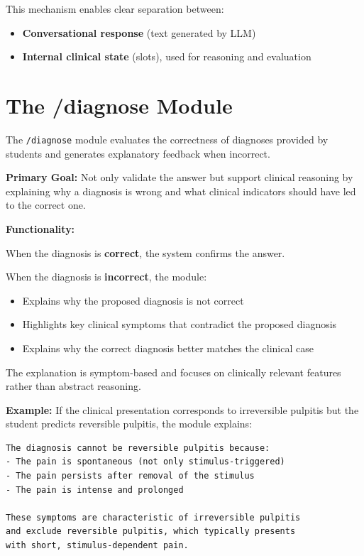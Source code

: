 \documentclass[runningheads,a4paper,11pt]{report}
\begin{document}
This mechanism enables clear separation between:
\begin{itemize}
\item \textbf{Conversational response} (text generated by LLM)
\item \textbf{Internal clinical state} (slots), used for reasoning and evaluation
\end{itemize}

\section{The /diagnose Module}
\label{section:diagnoseModule}

The \texttt{/diagnose} module evaluates the correctness of diagnoses provided by students and generates explanatory feedback when incorrect.

\textbf{Primary Goal:} Not only validate the answer but support clinical reasoning by explaining why a diagnosis is wrong and what clinical indicators should have led to the correct one.

\textbf{Functionality:}

When the diagnosis is \textbf{correct}, the system confirms the answer.

When the diagnosis is \textbf{incorrect}, the module:
\begin{itemize}
\item Explains why the proposed diagnosis is not correct
\item Highlights key clinical symptoms that contradict the proposed diagnosis
\item Explains why the correct diagnosis better matches the clinical case
\end{itemize}

The explanation is symptom-based and focuses on clinically relevant features rather than abstract reasoning.

\textbf{Example:} If the clinical presentation corresponds to irreversible pulpitis but the student predicts reversible pulpitis, the module explains:

\begin{verbatim}
The diagnosis cannot be reversible pulpitis because:
- The pain is spontaneous (not only stimulus-triggered)
- The pain persists after removal of the stimulus
- The pain is intense and prolonged

These symptoms are characteristic of irreversible pulpitis 
and exclude reversible pulpitis, which typically presents 
with short, stimulus-dependent pain.
\end{verbatim}
\end{document}

